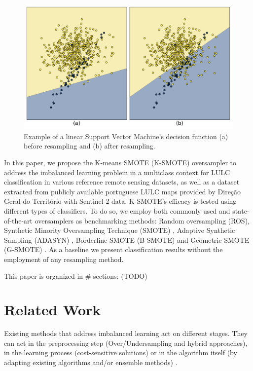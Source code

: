 \documentclass[parskip=full]{scrartcl}
\begin{document}
\begin{figure}[H]
	\centering
	\includegraphics[width=.75\linewidth]{../analysis/oversampling_decision_function}
	\caption{Example of a linear Support Vector Machine's decision function (a) before
		resampling and (b) after resampling.}
	\label{fig:oversampling_decision_function}
\end{figure}

In this paper, we propose the K-means SMOTE (K-SMOTE) \cite{Douzas2018}
oversampler to address the imbalanced learning problem in a multiclass context
for LULC classification in various reference remote sensing datasets, as well
as a dataset extracted from publicly available portuguese LULC maps provided by
Direção Geral do Território with Sentinel-2 data. K-SMOTE's efficacy is tested
using different types of classifiers. To do so, we employ both commonly used
and state-of-the-art oversamplers as benchmarking methods: Random oversampling
(ROS), Synthetic Minority Oversampling Technique (SMOTE)
\cite{Chawla2002}, Adaptive Synthetic Sampling (ADASYN)
\cite{HaiboHe2008}, Borderline-SMOTE (B-SMOTE) \cite{Han2005} and
Geometric-SMOTE (G-SMOTE) \cite{Douzas2019}. As a baseline we present
classification results without the employment of any resampling method.


This paper is organized in \# sections: (TODO)

\section{Related Work}

Existing methods that address imbalanced learning act on different stages. They
can act in the preprocessing step (Over/Undersampling and hybrid approaches),
in the learning process (cost-sensitive solutions) or in the algorithm itself
(by adapting existing algorithms and/or ensemble methods)
\cite{Kaur2019}.
\end{document}

